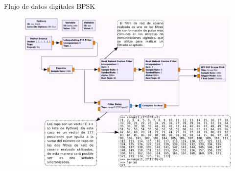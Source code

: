 \begin{frame}{Flujo de datos digitales BPSK}
\begin{figure}
\includegraphics[width=.8\textwidth]{parte1/lab5/pdf/lab5_3.pdf}
\end{figure}
\end{frame}


